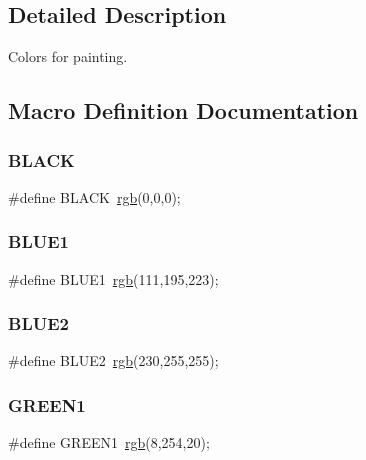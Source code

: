 \subsection{Detailed Description}
Colors for painting. 

\subsection{Macro Definition Documentation}
\hypertarget{group__colors_ga7b3b25cba33b07c303f3060fe41887f6}{}\label{group__colors_ga7b3b25cba33b07c303f3060fe41887f6} 
\subsubsection{\texorpdfstring{B\+L\+A\+CK}{BLACK}}
{\footnotesize\ttfamily \#define B\+L\+A\+CK~\hyperlink{group__colors_ga8ac8469511c64983e8f0a678a14f0e36}{rgb}(0,0,0);}

\hypertarget{group__colors_ga30100d62cd1f80d21430872e1be9c543}{}\label{group__colors_ga30100d62cd1f80d21430872e1be9c543} 
\subsubsection{\texorpdfstring{B\+L\+U\+E1}{BLUE1}}
{\footnotesize\ttfamily \#define B\+L\+U\+E1~\hyperlink{group__colors_ga8ac8469511c64983e8f0a678a14f0e36}{rgb}(111,195,223);}

\hypertarget{group__colors_ga741d26513518e80fdef905dc6f209fc8}{}\label{group__colors_ga741d26513518e80fdef905dc6f209fc8} 
\subsubsection{\texorpdfstring{B\+L\+U\+E2}{BLUE2}}
{\footnotesize\ttfamily \#define B\+L\+U\+E2~\hyperlink{group__colors_ga8ac8469511c64983e8f0a678a14f0e36}{rgb}(230,255,255);}

\hypertarget{group__colors_ga343686a86fcf4e10a82059b078b1b7d0}{}\label{group__colors_ga343686a86fcf4e10a82059b078b1b7d0} 
\subsubsection{\texorpdfstring{G\+R\+E\+E\+N1}{GREEN1}}
{\footnotesize\ttfamily \#define G\+R\+E\+E\+N1~\hyperlink{group__colors_ga8ac8469511c64983e8f0a678a14f0e36}{rgb}(8,254,20);}

